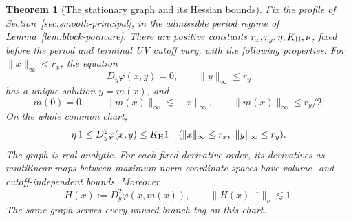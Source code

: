 \documentclass[11pt,reqno]{amsart}
\numberwithin{equation}{section}
\newtheorem{theorem}{Theorem}[section]
\theoremstyle{definition}
\theoremstyle{remark}
\begin{document}
\begin{theorem}[The stationary graph and its Hessian bounds]
\label{thm:uniform-stationary}
Fix the profile of Section~\ref{sec:smooth-principal}, in the
admissible period regime of Lemma~\ref{lem:block-poincare}.
There are positive constants \(r_x,r_y,\eta,K_{\rm H},\nu\),
fixed before the period and terminal UV cutoff vary,
with the following properties.
For \(\|x\|_\infty<r_x\), the equation
\begin{equation}
                   D_y\varphi(x,y)=0,\qquad \|y\|_\infty\le r_y
 \label{eq:model-stationary-equation}
\end{equation}
has a unique solution \(y=m(x)\), and
\begin{equation}
       m(0)=0,\qquad
       \|m(x)\|_\infty\lesssim\|x\|_\infty,
       \qquad \|m(x)\|_\infty\le r_y/2.
 \label{eq:model-centre-size}
\end{equation}
On the whole common chart,
\begin{equation}
       \eta\,1\le D_y^2\varphi(x,y)\le K_{\rm H}1
             \quad(\|x\|_\infty\le r_x,\ \|y\|_\infty\le r_y).
 \label{eq:model-two-sided-hessian}
\end{equation}
The graph is real analytic. For each fixed derivative order,
its derivatives as multilinear maps between maximum-norm
coordinate spaces have volume- and cutoff-independent bounds.
Moreover
\begin{equation}
       H(x):=D_y^2\varphi(x,m(x)),\qquad
       \|H(x)^{-1}\|_\nu\lesssim1.
 \label{eq:model-moving-inverse}
\end{equation}
The same graph serves every unused branch tag on this chart.
\end{theorem}
\end{document}
